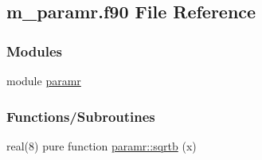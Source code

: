 \hypertarget{m__paramr_8f90}{}\subsection{m\+\_\+paramr.\+f90 File Reference}
\label{m__paramr_8f90}
\subsubsection*{Modules}
\begin{DoxyCompactItemize}
\item 
module \hyperlink{namespaceparamr}{paramr}
\end{DoxyCompactItemize}
\subsubsection*{Functions/\+Subroutines}
\begin{DoxyCompactItemize}
\item 
real(8) pure function \hyperlink{namespaceparamr_a53c781b6c851a009fdda9383f9289cf6}{paramr\+::sqrtb} (x)
\end{DoxyCompactItemize}
